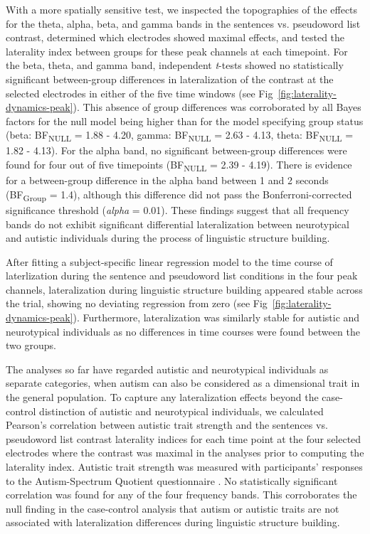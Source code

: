 With a more spatially sensitive test, we inspected the topographies of the effects for the theta, alpha, beta, and gamma bands in the sentences vs. pseudoword list contrast, determined which electrodes showed maximal effects, and tested the laterality index between groups for these peak channels at each timepoint. For the beta, theta, and gamma band, independent \textit{t}-tests showed no statistically significant between-group differences in lateralization of the contrast at the selected electrodes in either of the five time windows (see Fig~\ref{fig:laterality-dynamics-peak}). This absence of group differences was corroborated by all Bayes factors for the null model being higher than for the model specifying group status (beta: BF\textsubscript{NULL} = 1.88 - 4.20, gamma: BF\textsubscript{NULL} = 2.63 - 4.13, theta: BF\textsubscript{NULL} = 1.82 - 4.13). For the alpha band, no significant between-group differences were found for four out of five timepoints (BF\textsubscript{NULL} = 2.39 - 4.19). There is evidence for a between-group difference in the alpha band between 1 and 2 seconds (BF\textsubscript{Group} = 1.4), although this difference did not pass the Bonferroni-corrected significance threshold (\textit{alpha}  = 0.01). These findings suggest that all frequency bands do not exhibit significant differential lateralization between neurotypical and autistic individuals during the process of linguistic structure building. 

After fitting a subject-specific linear regression model to the time course of laterlization during the sentence and pseudoword list conditions in the four peak channels, lateralization during linguistic structure building appeared stable across the trial, showing no deviating regression from zero (see Fig~\ref{fig:laterality-dynamics-peak}). Furthermore, lateralization was similarly stable for autistic and neurotypical individuals as no differences in time courses were found between the two groups. 

The analyses so far have regarded autistic and neurotypical individuals as separate categories, when autism can also be considered as a dimensional trait in the general population. To capture any lateralization effects beyond the case-control distinction of autistic and neurotypical individuals, we calculated Pearson's correlation between autistic trait strength and the sentences vs. pseudoword list contrast laterality indices for each time point at the four selected electrodes where the contrast was maximal in the analyses prior to computing the laterality index. Autistic trait strength was measured with participants' responses to the Autism-Spectrum Quotient questionnaire \citep[AQ;][]{baron-cohen2001AQ}. No statistically significant correlation was found for any of the four frequency bands. This corroborates the null finding in the case-control analysis that autism or autistic traits are not associated with lateralization differences during linguistic structure building. 

